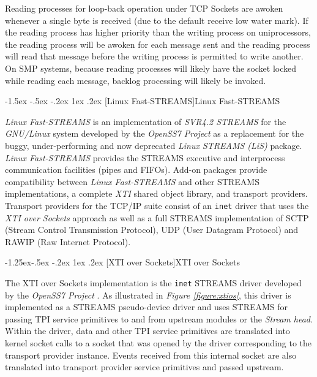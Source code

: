 \documentclass[letterpaper,final,notitlepage,twocolumn,10pt,twoside]{article}
\makeatletter
\renewcommand\subsection{\@startsection{subsection}{2}{\z@}%
                                     {-1.5ex \@plus -.5ex \@minus -.2ex}%
                                     {1ex \@plus .2ex}%
                                     {\normalfont\normalsize\bfseries}}
\renewcommand\subsubsection{\@startsection{subsubsection}{3}{\z@}%
                                     {-1.25ex\@plus -.5ex \@minus -.2ex}%
                                     {1ex \@plus .2ex}%
                                     {\normalfont\normalsize\bfseries}}
\makeatother
\begin{document}
Reading processes for loop-back operation under TCP Sockets are awoken whenever a single byte is received
(due to the default receive low water mark).  If the reading process has higher priority than the
writing process on uniprocessors, the reading process will be awoken for each message sent and the
reading process will read that message before the writing process is permitted to write another.  On
SMP systems, because reading processes will likely have the socket locked while reading each
message, backlog processing will likely be invoked.

\subsection[Linux Fast-STREAMS]{Linux Fast-STREAMS}

\textsl{Linux Fast-STREAMS} is an implementation of \textsl{SVR4.2 STREAMS} for the
\textsl{GNU/Linux} system developed by the \textsl{OpenSS7 Project} \cite[]{openss7} as a
replacement for the buggy, under-performing and now deprecated \textsl{Linux STREAMS (LiS)} package.
\textsl{Linux Fast-STREAMS} provides the STREAMS executive and interprocess communication facilities
(pipes and FIFOs).  Add-on packages provide compatibility between \textsl{Linux Fast-STREAMS} and
other STREAMS implementations, a complete \textsl{XTI} shared object library, and transport
providers.  Transport providers for the TCP/IP suite consist of an \texttt{inet} driver that uses
the \textit{XTI over Sockets} approach as well as a full STREAMS implementation of SCTP (Stream
Control Transmission Protocol), UDP (User Datagram Protocol) and RAWIP (Raw Internet Protocol).

\subsubsection[XTI over Sockets]{XTI over Sockets}
\label{section:xtios}

The XTI over Sockets implementation is the \texttt{inet} STREAMS driver developed by the
\textsl{OpenSS7 Project} \cite[]{openss7}. As illustrated in \textit{Figure \ref{figure:xtios}},
this driver is implemented as a STREAMS pseudo-device driver and uses STREAMS for passing TPI
service primitives to and from upstream modules or the \textit{Stream head}.  Within the driver,
data and other TPI service primitives are translated into kernel socket calls to a socket that was
opened by the driver corresponding to the transport provider instance.  Events received from this
internal socket are also translated into transport provider service primitives and passed upstream.
\end{document}
